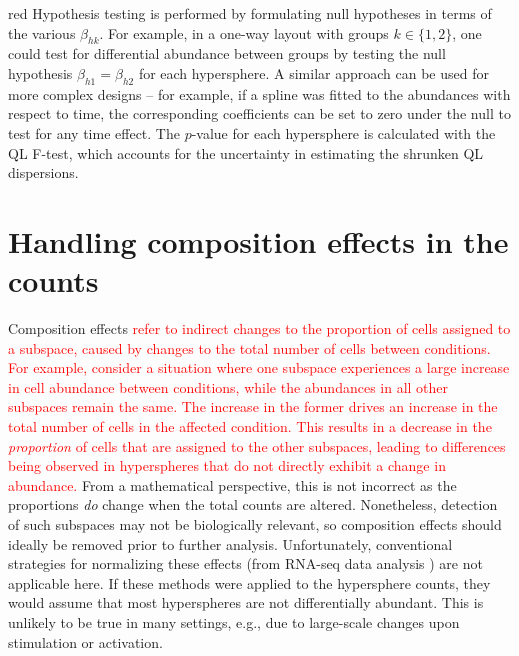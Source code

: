 \documentclass{article}
\newcommand\revised[1]{\textcolor{red}{#1}}
\begin{document}
\begin{color}{red}
Hypothesis testing is performed by formulating null hypotheses in terms of the various $\beta_{hk}$.
For example, in a one-way layout with groups $k\in\{1,2\}$, one could test for differential abundance between groups by testing the null hypothesis $\beta_{h1}=\beta_{h2}$ for each hypersphere.
A similar approach can be used for more complex designs -- for example, if a spline was fitted to the abundances with respect to time, the corresponding coefficients can be set to zero under the null to test for any time effect.
The $p$-value for each hypersphere is calculated with the QL F-test, which accounts for the uncertainty in estimating the shrunken QL dispersions. 
\end{color}

\section{Handling composition effects in the counts}
Composition effects \revised{refer to indirect changes to the proportion of cells assigned to a subspace, caused by changes to the total number of cells between conditions.
For example, consider a situation where one subspace experiences a large increase in cell abundance between conditions, while the abundances in all other subspaces remain the same.
The increase in the former drives an increase in the total number of cells in the affected condition.
This results in a decrease in the \textit{proportion} of cells that are assigned to the other subspaces, leading to differences being observed in hyperspheres that do not directly exhibit a change in abundance.}
From a mathematical perspective, this is not incorrect as the proportions \textit{do} change when the total counts are altered.
Nonetheless, detection of such subspaces may not be biologically relevant, so composition effects should ideally be removed prior to further analysis.
Unfortunately, conventional strategies for normalizing these effects (from RNA-seq data analysis \cite{robinson2010scaling}) are not applicable here.
If these methods were applied to the hypersphere counts, they would assume that most hyperspheres are not differentially abundant.
This is unlikely to be true in many settings, e.g., due to large-scale changes upon stimulation or activation.
\end{document}
